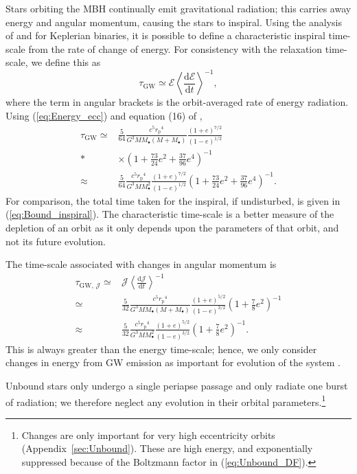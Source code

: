 \documentclass[useAMS,usedcolumn,usegraphicx,usenatbib]{mn2e}
\newcommand{\eqnref}[1]{(\ref{eq:#1})}
\newcommand{\apref}[1]{Appendix~\ref{sec:#1}}
\newcommand{\sub}[1]{\ensuremath{_\mathrm{#1}}}
\newcommand{\dd}{\ensuremath{\mathrm{d}}}
\newcommand{\diff}[2]{\ensuremath{\frac{\dd {#1}}{\dd {#2}}}}
\begin{document}
Stars orbiting the MBH continually emit gravitational radiation; this carries away energy and angular momentum, causing the stars to inspiral. Using the analysis of \citet{Peters1963} and \citet{Peters1964} for Keplerian binaries, it is possible to define a characteristic inspiral time-scale from the rate of change of energy. For consistency with the relaxation time-scale, we define this as \citep{MiraldaEscude2000, Merritt2011}
\begin{equation}
\tau\sub{GW} \simeq \mathcal{E}\left\langle\diff{\mathcal{E}}{t}\right\rangle^{-1},
\label{eq:tGW-def}
\end{equation}
where the term in angular brackets is the orbit-averaged rate of energy radiation. Using \eqnref{Energy_ecc} and equation (16) of \citet{Peters1963},
\begin{align}
\tau\sub{GW} \simeq {} & \frac{5}{64}\frac{c^5r\sub{p}^4}{G^3MM_\bullet\left(M + M_\bullet\right)}\frac{(1+e)^{7/2}}{(1-e)^{1/2}} \nonumber \\*
 {} & \times {} \left(1+\frac{73}{24}e^2 + \frac{37}{96}e^4\right)^{-1} \\
 \approx {} & \frac{5}{64}\frac{c^5r\sub{p}^4}{G^3MM_\bullet^2}\frac{(1+e)^{7/2}}{(1-e)^{1/2}}\left(1+\frac{73}{24}e^2 + \frac{37}{96}e^4\right)^{-1}.
\end{align}
For comparison, the total time taken for the inspiral, if undisturbed, is given in \eqnref{Bound_inspiral}. The characteristic time-scale is a better measure of the depletion of an orbit as it only depends upon the parameters of that orbit, and not its future evolution.

The time-scale associated with changes in angular momentum is \citep{Peters1964}
\begin{align}
\tau_{\mathrm{GW},\, \mathcal{J}} \simeq {} & \mathcal{J}\left\langle\diff{\mathcal{J}}{t}\right\rangle^{-1} \\
 \simeq {} & \frac{5}{32}\frac{c^5r\sub{p}^4}{G^3MM_\bullet\left(M + M_\bullet\right)}\frac{(1+e)^{5/2}}{(1-e)^{3/2}}\left(1+\frac{7}{8}e^2\right)^{-1} \\
 \approx {} & \frac{5}{32}\frac{c^5r\sub{p}^4}{G^3MM_\bullet^2}\frac{(1+e)^{5/2}}{(1-e)^{3/2}}\left(1+\frac{7}{8}e^2\right)^{-1}.
\end{align}
This is always greater than the energy time-scale; hence, we only consider changes in energy from GW emission as important for evolution of the system \citep{Hopman2005}.

Unbound stars only undergo a single periapse passage and only radiate one burst of radiation; we therefore neglect any evolution in their orbital parameters.\footnote{Changes are only important for very high eccentricity orbits (\apref{Unbound}). These are high energy, and exponentially suppressed because of the Boltzmann factor in \eqnref{Unbound_DF}.}
\end{document}
